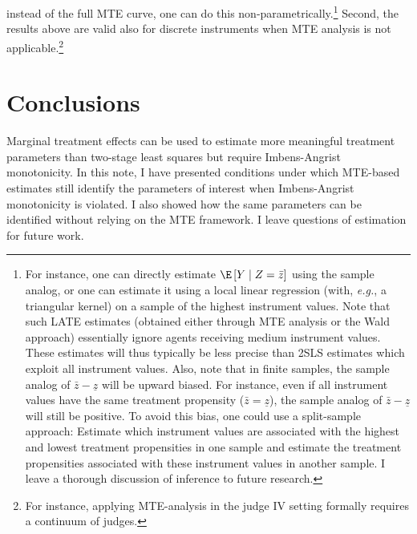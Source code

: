 instead of the full MTE curve, one can do this non-parametrically.\footnote{For instance, one can directly estimate $\E\left[Y\mid Z=\bar{z}\right]$
using the sample analog, or one can estimate it using a local linear
regression (with, \emph{e.g.}, a triangular kernel) on a sample of
the highest instrument values. Note that such LATE estimates (obtained
either through MTE analysis or the Wald approach) essentially ignore
agents receiving medium instrument values. These estimates will thus
typically be less precise than 2SLS estimates which exploit all instrument
values. Also, note that in finite samples, the sample analog of $\bar{z}-\underline{z}$
will be upward biased. For instance, even if all instrument values
have the same treatment propensity ($\bar{z}=\underline{z}$), the
sample analog of $\bar{z}-\underline{z}$ will still be positive.
To avoid this bias, one could use a split-sample approach: Estimate
which instrument values are associated with the highest and lowest
treatment propensities in one sample and estimate the treatment propensities
associated with these instrument values in another sample. I leave
a thorough discussion of inference to future research.} Second, the results above are valid also for discrete instruments
when MTE analysis is not applicable.\footnote{For instance, applying MTE-analysis in the judge IV setting formally
requires a continuum of judges.}

\section{Conclusions\label{sec:conclusions}}

Marginal treatment effects can be used to estimate more meaningful
treatment parameters than two-stage least squares but require Imbens-Angrist
monotonicity. In this note, I have presented conditions under which
MTE-based estimates still identify the parameters of interest when
Imbens-Angrist monotonicity is violated. I also showed how the same
parameters can be identified without relying on the MTE framework.
I leave questions of estimation for future work.

\small




\normalsize

\clearpage{}

\appendix

